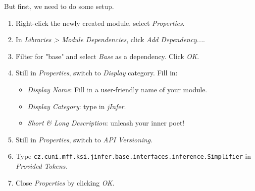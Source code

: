 \documentclass[a4paper,10pt,oneside]{article}
\begin{document}
\par 
But first, we need to do some setup.
\begin{enumerate}
  \item Right-click the newly created module, select \textit{Properties}.
  \item In \textit{Libraries > Module Dependencies}, click \textit{Add Dependency...}.
  \item Filter for "base" and select \textit{Base} as a dependency. Click \textit{OK}.
  \item 
      Still in \textit{Properties}, switch to \textit{Display} category. Fill in:
      \begin{itemize}
        \item \textit{Display Name}: Fill in a user-friendly name of your module.
        \item \textit{Display Category}: type in \textit{jInfer}.
        \item \textit{Short \& Long Description}: unleash your inner poet!
      \end{itemize}
  
  \item Still in \textit{Properties}, switch to \textit{API Versioning}.
  \item Type \texttt{cz.cuni.mff.ksi.jinfer.base.interfaces.inference.Simplifier} in \textit{Provided Tokens}.
  \item Close \textit{Properties} by clicking \textit{OK}.
\end{enumerate}
\end{document}
